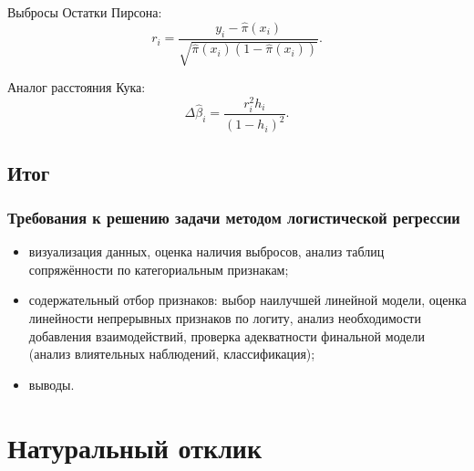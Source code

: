 \documentclass[9pt,pdf,utf8,hyperref={unicode},aspectratio=169]{beamer}
\begin{document}
%
\begin{frame}{Выбросы}
    Остатки Пирсона:
    $$r_i = \frac{y_i-\hat{\pi}\left(x_i\right)}{\sqrt{\hat{\pi}\left(x_i\right)\left(1-\hat{\pi}\left(x_i\right)\right)}}.$$

    Аналог расстояния Кука:
    $$\Delta\hat{\beta}_i = \frac{r^2_{i} h_i}{\left(1-h_i\right)^2}.$$
\end{frame}

%
%	

\subsection{Итог}
\begin{frame}
    \frametitle{Требования к решению задачи методом логистической регрессии}
    \begin{itemize}
    \item визуализация данных, оценка наличия выбросов, анализ таблиц сопряжённости по категориальным признакам;
    \item содержательный отбор признаков: выбор наилучшей линейной модели, оценка линейности непрерывных признаков по логиту, анализ необходимости добавления взаимодействий, проверка адекватности финальной модели (анализ влиятельных наблюдений, классификация);
    \item выводы.
    \end{itemize}
\end{frame}

\section{Натуральный отклик}
\end{document}
